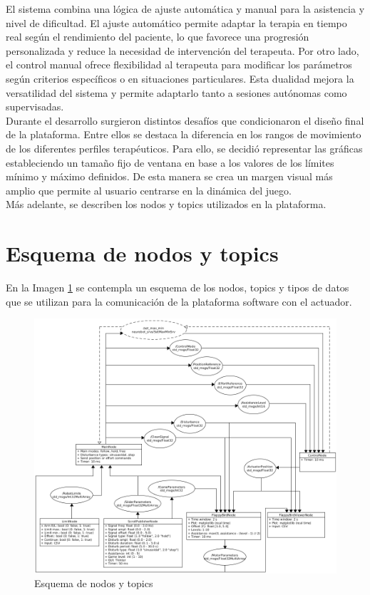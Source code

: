 El sistema combina una lógica de ajuste automática y manual para la asistencia y nivel de dificultad.
El ajuste automático permite adaptar la terapia en tiempo real según el rendimiento del paciente, lo que favorece una progresión personalizada y reduce la necesidad de intervención del terapeuta.
Por otro lado, el control manual ofrece flexibilidad al terapeuta para modificar los parámetros según criterios específicos o en situaciones particulares.
Esta dualidad mejora la versatilidad del sistema y permite adaptarlo tanto a sesiones autónomas como supervisadas.\\

Durante el desarrollo surgieron distintos desafíos que condicionaron el diseño final de la plataforma.
Entre ellos se destaca la diferencia en los rangos de movimiento de los diferentes perfiles terapéuticos.
Para ello, se decidió representar las gráficas estableciendo un tamaño fijo de ventana en base a los valores de los límites mínimo y máximo definidos.
De esta manera se crea un margen visual más amplio que permite al usuario centrarse en la dinámica del juego.\\

Más adelante, se describen los nodos y topics utilizados en la plataforma.

\section{Esquema de nodos y topics}
\label{section:review}

En la Imagen \ref{fig:nodes} se contempla un esquema de los nodos, topics y tipos de datos que se utilizan para la comunicación de la plataforma software con el actuador.

\begin{figure}[ht!]
	\centering
	\begin{minipage}{1.0\linewidth}
		\centering
		\includegraphics[width=\linewidth]{figs/esquema_nodos.png}
	\end{minipage}
	\caption[Esquema de nodos y topics]{Esquema de nodos y topics}
	\label{fig:nodes}
\end{figure}

